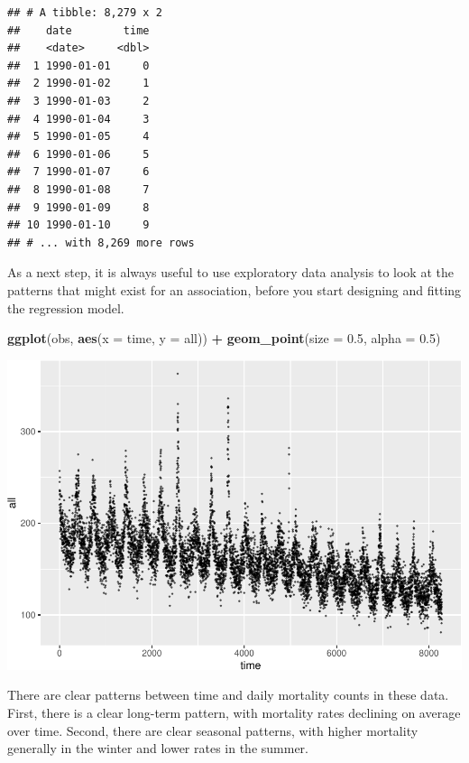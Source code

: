 \documentclass[
]{book}
\newenvironment{Shaded}{\begin{snugshade}}{\end{snugshade}}
\newcommand{\DataTypeTok}[1]{\textcolor[rgb]{0.13,0.29,0.53}{#1}}
\newcommand{\FloatTok}[1]{\textcolor[rgb]{0.00,0.00,0.81}{#1}}
\newcommand{\KeywordTok}[1]{\textcolor[rgb]{0.13,0.29,0.53}{\textbf{#1}}}
\newcommand{\NormalTok}[1]{#1}
\newcommand{\OperatorTok}[1]{\textcolor[rgb]{0.81,0.36,0.00}{\textbf{#1}}}
\newcommand{\StringTok}[1]{\textcolor[rgb]{0.31,0.60,0.02}{#1}}
\begin{document}
\begin{verbatim}
## # A tibble: 8,279 x 2
##    date        time
##    <date>     <dbl>
##  1 1990-01-01     0
##  2 1990-01-02     1
##  3 1990-01-03     2
##  4 1990-01-04     3
##  5 1990-01-05     4
##  6 1990-01-06     5
##  7 1990-01-07     6
##  8 1990-01-08     7
##  9 1990-01-09     8
## 10 1990-01-10     9
## # ... with 8,269 more rows
\end{verbatim}

As a next step, it is always useful to use exploratory data analysis to look
at the patterns that might exist for an association, before you start designing
and fitting the regression model.

\begin{Shaded}
\begin{Highlighting}[]
\KeywordTok{ggplot}\NormalTok{(obs, }
       \KeywordTok{aes}\NormalTok{(}\DataTypeTok{x =}\NormalTok{ time, }\DataTypeTok{y =}\NormalTok{ all)) }\OperatorTok{+}
\StringTok{  }\KeywordTok{geom_point}\NormalTok{(}\DataTypeTok{size =} \FloatTok{0.5}\NormalTok{, }\DataTypeTok{alpha =} \FloatTok{0.5}\NormalTok{)}
\end{Highlighting}
\end{Shaded}

\includegraphics{adv_epi_analysis_files/figure-latex/unnamed-chunk-48-1.pdf}

There are clear patterns between time and daily mortality counts in these data.
First, there is a clear long-term pattern, with mortality rates declining on
average over time. Second, there are clear seasonal patterns, with higher
mortality generally in the winter and lower rates in the summer.
\end{document}
